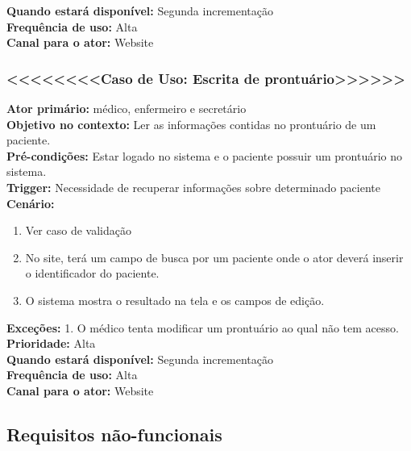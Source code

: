 \documentclass[12pt,a4paper]{report}
\begin{document}
\textbf{Quando estará disponível:} Segunda incrementação\\

\textbf{Frequência de uso:} Alta\\

\textbf{Canal para o ator:} Website\\


\subsubsection{<<<<<<<<Caso de Uso: Escrita de prontuário>>>>>>}

\textbf{Ator primário:} médico, enfermeiro e secretário\\

\textbf{Objetivo no contexto:} Ler as informações contidas no prontuário de um paciente.\\

\textbf{Pré-condições:} Estar logado no sistema e o paciente possuir um prontuário no sistema.\\

\textbf{Trigger:} Necessidade de recuperar informações sobre determinado paciente\\

\textbf{Cenário:}
\begin{enumerate}
\item Ver caso de validação
\item No site, terá um campo de busca por um paciente onde o ator deverá inserir o identificador do paciente.
\item O sistema mostra o resultado na tela e os campos de edição.
\end{enumerate}


\textbf{Exceções:}
1. O médico tenta modificar um prontuário ao qual não tem acesso.\\

\textbf{Prioridade:} Alta\\

\textbf{Quando estará disponível:} Segunda incrementação\\

\textbf{Frequência de uso:} Alta\\

\textbf{Canal para o ator:} Website\\



\subsection{Requisitos não-funcionais}
\end{document}
